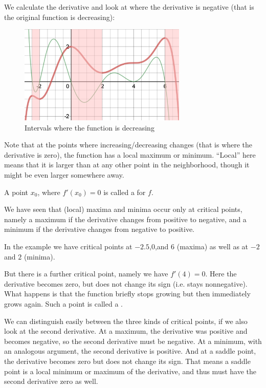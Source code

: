 We calculate the derivative and look at where the derivative is negative
(that is the original function is decreasing):
\begin{figure}
\begin{center}
\includegraphics[width=8cm]{pic/Kurdi2.pdf}
\end{center}
\caption{Intervals where the function is decreasing}
\label{figkurvdiss2}
\end{figure}

Note that at the points where increasing/decreasing changes (that is where
the derivative is zero), the function has a local maximum or minimum.
``Local'' here
means that it is larger than at any other point in the neighborhood, though
it might be even larger somewhere away.
\begin{defn}
A point $x_0$, where $f'(x_0)=0$ is called a  for
$f$.
\end{defn}
We have seen that (local) maxima and minima occur only at critical points,
namely a maximum if the derivative changes from positive to negative, and a
minimum if the derivative changes from negative to positive.

In the example we have critical points at $-2.5$,$0$,and $6$ (maxima) as
well as at $-2$ and $2$ (minima).

But there is a further critical point,
namely we have $f'(4)=0$. Here the derivative becomes zero, but does not
change its sign (i.e. stays nonnegative). What happens is that the function
briefly stops growing but then immediately grows again. Such a point is
called a .

We can distinguish easily between the three kinds of critical points, if we
also look at the second derivative. At a maximum, the derivative was
positive and becomes negative, so the second derivative must be negative.
At a minimum, with an analogous argument, the second derivative is positive.
And at a saddle point, the derivative becomes zero but does not change its
sign. That means a saddle point is a local minimum or maximum of the
derivative, and thus must have the second derivative zero as well.
